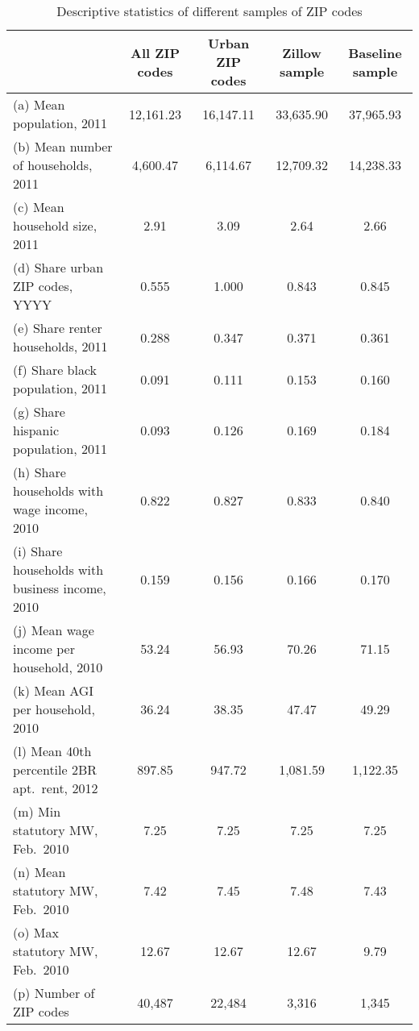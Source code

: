 \begin{table}[hbt!] \centering
    \caption{Descriptive statistics of different samples of ZIP codes}
    \label{tab:stats_zip_samples}
    \begin{tabular}{@{}lcccc@{}}
        \toprule
                                                        & \multicolumn{1}{c}{All ZIP codes} 
                                                        & \multicolumn{1}{c}{Urban ZIP codes} 
                                                        & \multicolumn{1}{c}{Zillow sample} 
                                                        & \multicolumn{1}{c}{Baseline sample}      \\ \midrule
        (a) Mean population, 2011                       & 12,161.23 & 16,147.11  & 33,635.90  & 37,965.93    \\
        (b) Mean number of households, 2011             & 4,600.47  & 6,114.67  & 12,709.32  & 14,238.33      \\
        (c) Mean household size, 2011                   & 2.91    & 3.09  & 2.64  & 2.66         \\
        (d) Share urban ZIP codes, YYYY                 & 0.555    & 1.000   & 0.843   & 0.845          \\
        (e) Share renter households, 2011               & 0.288    & 0.347   & 0.371   & 0.361          \\
        (f) Share black population, 2011                & 0.091    & 0.111   & 0.153   & 0.160          \\
        (g) Share hispanic population, 2011             & 0.093    & 0.126   & 0.169   & 0.184          \\
        (h) Share households with wage income, 2010     & 0.822    & 0.827   & 0.833   & 0.840          \\
        (i) Share households with business income, 2010 & 0.159    & 0.156   & 0.166   & 0.170          \\
        (j) Mean wage income per household, 2010        & 53.24   & 56.93  & 70.26  & 71.15         \\
        (k) Mean AGI per household, 2010                & 36.24   & 38.35  & 47.47  & 49.29         \\
        (l) Mean 40th percentile 2BR apt.\ rent, 2012   & 897.85   & 947.72  & 1,081.59  & 1,122.35         \\
        (m) Min statutory MW, Feb.\ 2010                & 7.25    & 7.25  & 7.25  & 7.25         \\
        (n) Mean statutory MW, Feb.\ 2010               & 7.42    & 7.45  & 7.48  & 7.43         \\
        (o) Max statutory MW, Feb.\ 2010                & 12.67   & 12.67   & 12.67  & 9.79         \\
        (p) Number of ZIP codes                         & 40,487  & 22,484  & 3,316  & 1,345      \\ \bottomrule
    \end{tabular}


\end{table}
